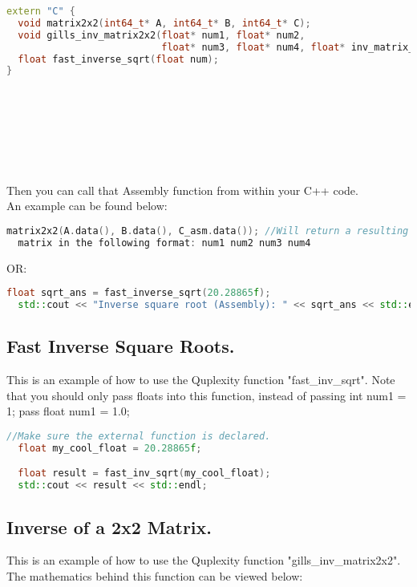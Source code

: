\documentclass{article}
\begin{document}
\begin{lstlisting}[language=C++, frame=single]
extern "C" {
  void matrix2x2(int64_t* A, int64_t* B, int64_t* C);
  void gills_inv_matrix2x2(float* num1, float* num2,
                           float* num3, float* num4, float* inv_matrix_C);
  float fast_inverse_sqrt(float num);
}
\end{lstlisting}

\noindent \\\\\\\\\\\\Then you can call that Assembly function from within your C++ code. \\
An example can be found below: \\
\begin{lstlisting}[language=C++, frame=single]
  matrix2x2(A.data(), B.data(), C_asm.data()); //Will return a resulting 
  matrix in the following format: num1 num2 num3 num4
\end{lstlisting}

\noindent OR:

\begin{lstlisting}[language=C++, frame=single]
  float sqrt_ans = fast_inverse_sqrt(20.28865f);
  std::cout << "Inverse square root (Assembly): " << sqrt_ans << std::endl;
\end{lstlisting}


\subsection*{Fast Inverse Square Roots.}
This is an example of how to use the Quplexity function "fast\_inv\_sqrt". 
Note that you should only pass floats into this function, instead of passing int num1 = 1; pass float num1 = 1.0;

\begin{lstlisting}[language=C++, frame=single]
  //Make sure the external function is declared.
  float my_cool_float = 20.28865f;

  float result = fast_inv_sqrt(my_cool_float);
  std::cout << result << std::endl;
\end{lstlisting}

\subsection*{Inverse of a 2x2 Matrix.}
This is an example of how to use the Quplexity function "gills\_inv\_matrix2x2". \\
The mathematics behind this function can be viewed below: \\
\end{document}
